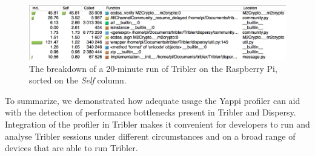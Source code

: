 \begin{figure}[!h]
	\centering
	\includegraphics[width=1.0\columnwidth]{images/experiments/yappi_breakdown_self}
	\caption{The breakdown of a 20-minute run of Tribler on the Raspberry Pi, sorted on the \emph{Self} column.}
	\label{fig:yappi_breakdown_self}
\end{figure}

\noindent To summarize, we demonstrated how adequate usage the Yappi profiler can aid with the detection of performance bottlenecks present in Tribler and Dispersy. Integration of the profiler in Tribler makes it convenient for developers to run and analyse Tribler sessions under different circumstances and on a broad range of devices that are able to run Tribler.

